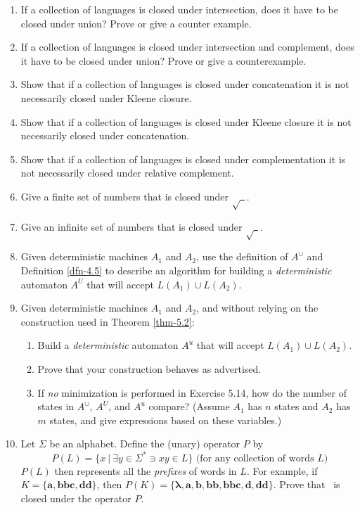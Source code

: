 \begin{enumerate}[{5.}1. ]
\item If a collection of languages is closed under intersection, does it have
to be closed under union? Prove or give a counter example.

\item If a collection of languages is closed under intersection and complement,
does it have to be closed under union? Prove or give a counterexample.

\item Show that if a collection of languages is closed under concatenation it
is not necessarily closed under Kleene closure.

\item Show that if a collection of languages is closed under Kleene closure it
is not necessarily closed under concatenation.

\item Show that if a collection of languages is closed under complementation it
is not necessarily closed under relative complement.

\item Give a finite set of numbers that is closed under $\sqrt{\ \ }$.

\item Give an infinite set of numbers that is closed under $\sqrt{\ \ }$.

\item Given deterministic machines $A_1$ and $A_2$, use the definition of
$A^\cup$ and Definition \ref{dfn-4.5} to describe an algorithm for building a
\emph{deterministic} automaton $A^U$ that will accept $L(A_1) \cup L(A_2)$.

\item Given deterministic machines $A_1$ and $A_2$, and without relying on the
construction used in Theorem \ref{thm-5.2}:
\begin{enumerate}
\item Build a \emph{deterministic} automaton $A^u$ that will accept
$L(A_1) \cup L(A_2)$.
\item Prove that your construction behaves as advertised.
\item If \emph{no} minimization is performed in Exercise 5.14, how do the number of
states in $A^\cup$, $A^U$, and $A^u$ compare? (Assume $A_1$ has $n$ states
and $A_2$ has $m$ states, and give expressions based on these variables.)
\end{enumerate}

\item Let $\Sigma$ be an alphabet. Define the (unary) operator $P$ by
\[ P(L)=\{x\ |\  \exists y \in \Sigma^* \ni xy \in L\}\text{ (for any collection of
words $L$)} \]
$P(L)$ then represents all the \emph{prefixes} of words in $L$. For example, if
$K =\{\pmb{a},\pmb{bbc},\pmb{dd}\}$, then
$P(K)=\{\pmb{\lambda},\pmb{a},\pmb{b},\pmb{bb},\pmb{bbc},\pmb{d},\pmb{dd}\}$. Prove
that \DSIG\ is closed under the operator $P$.


\end{enumerate}
